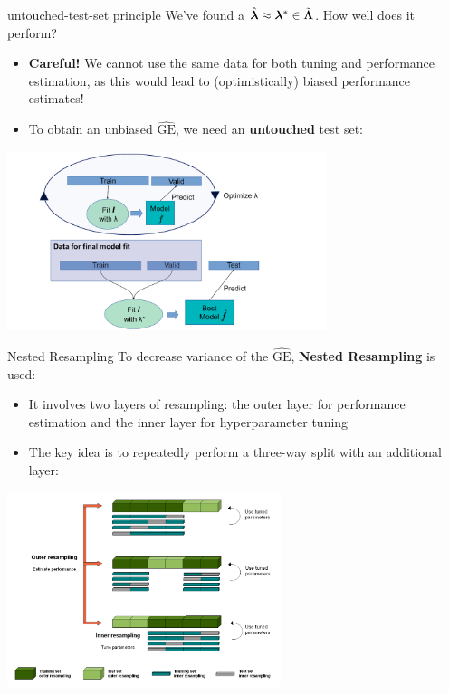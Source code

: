 \documentclass[11pt,compress,t,notes=noshow, xcolor=table]{beamer}
\begin{document}
\begin{vbframe}{untouched-test-set principle}
We've found a $\hat{\bm{\lambda}} \approx \bm{\lambda}^{*} \in \tilde{\bm{\Lambda}}$. How well does it perform?
\begin{itemize}
\item \textbf{Careful!} We cannot use the same data for both tuning and performance estimation, as this would lead to (optimistically) biased performance estimates!
\item To obtain an unbiased $\widehat{\mathrm{GE}}$, we need an \textbf{untouched} test set:
\end{itemize}
\begin{center}
\includegraphics[width=0.7\textwidth]{../nested-resampling/figure_man/train_valid_test.pdf}
\end{center}

\end{vbframe}



\begin{vbframe}{Nested Resampling}
To decrease variance of the $\widehat{\mathrm{GE}}$, \textbf{Nested Resampling} is used:

\begin{itemize}
\item \small It involves two layers of resampling: the outer layer for performance estimation and the inner layer for hyperparameter tuning
\item \small The key idea is to repeatedly perform a three-way split with an additional layer:
\end{itemize}

\begin{center}
\includegraphics[width = 0.6\textwidth]{../nested-resampling/figure_man/Nested_Resampling.png}
\end{center}

\end{vbframe}
\end{document}
